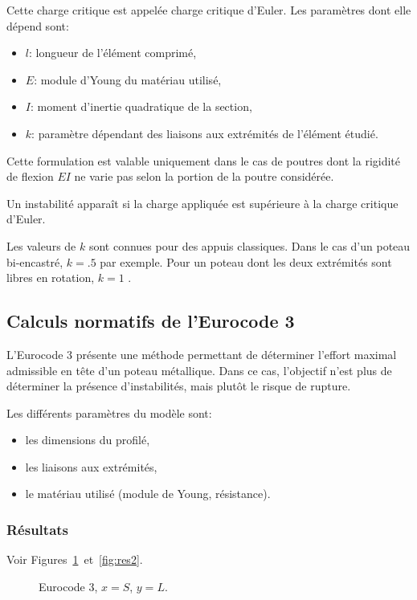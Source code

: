 \documentclass{report}
\begin{document}
Cette charge critique est appelée charge critique d'Euler. Les paramètres dont elle dépend sont:
\begin{itemize}
    \item $l$: longueur de l'élément comprimé,
    \item $E$: module d'Young du matériau utilisé,
    \item $I$: moment d'inertie quadratique de la section,
    \item $k$: paramètre dépendant des liaisons aux extrémités de l'élément étudié.
\end{itemize}

Cette formulation est valable uniquement dans le cas de poutres dont la rigidité de flexion $EI$ ne varie pas selon la portion de la poutre considérée.

Un instabilité apparaît si la charge appliquée est supérieure à la charge critique d'Euler.

Les valeurs de $k$ sont connues pour des appuis classiques. Dans le cas d'un poteau bi-encastré, $k=\num{.5}$ par exemple. Pour un poteau dont les deux extrémités sont libres en rotation, $k=\num{1}$ \cite{coursfla}.

\subsection{Calculs normatifs de l'Eurocode 3}
L'Eurocode 3 \cite{EC3} présente une méthode permettant de déterminer l'effort maximal admissible en tête d'un poteau métallique. Dans ce cas, l'objectif n'est plus de déterminer la présence d'instabilités, mais plutôt le risque de rupture.

Les différents paramètres du modèle sont:
\begin{itemize}
    \item les dimensions du profilé,
    \item les liaisons aux extrémités,
    \item le matériau utilisé (module de Young, résistance).
\end{itemize}

\subsubsection{Résultats}
Voir Figures~\ref{fig:res1}~et~\ref{fig:res2}.

\begin{figure}[!ht]
    \centering
    
    \caption{Eurocode 3, $x=S$, $y=L$.}\label{fig:res1}
\end{figure}
\end{document}
